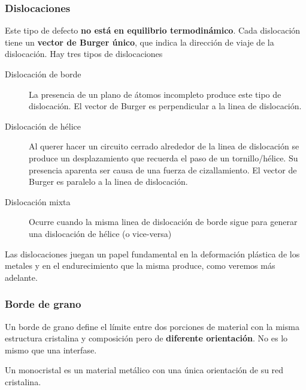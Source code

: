 \subsubsection{Dislocaciones}

Este tipo de defecto \textbf{no está en equilibrio termodinámico}. Cada dislocación tiene un \textbf{vector de Burger único}, que indica la dirección de viaje de la dislocación.
Hay tres tipos de dislocaciones

\begin{description}
    \item[Dislocación de borde] La presencia de un plano de átomos incompleto produce este tipo de dislocación. El vector de Burger es perpendicular a la linea de dislocación.
    \item[Dislocación de hélice] Al querer hacer un circuito cerrado alrededor de la linea de dislocación se produce un desplazamiento que recuerda el paso de un tornillo/hélice. Su presencia aparenta ser causa de una fuerza de cizallamiento. El vector de Burger es paralelo a la linea de dislocación.
    \item[Dislocación mixta] Ocurre cuando la misma linea de dislocación de borde sigue para generar una dislocación de hélice (o vice-versa)  
\end{description}

Las dislocaciones juegan un papel fundamental en la deformación plástica de los metales y en el endurecimiento que la misma produce, como veremos más adelante.

\subsubsection{Borde de grano}

Un borde de grano define el límite entre dos porciones de material con la misma estructura cristalina y composición pero de \textbf{diferente orientación}. No es lo mismo que una interfase.


Un monocristal es un material metálico con una única orientación de su red cristalina.

